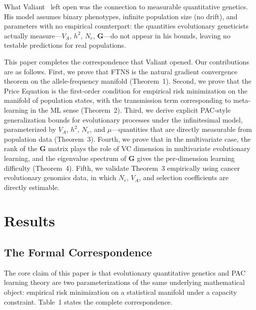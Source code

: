 \documentclass[12pt]{article}
\theoremstyle{remark}
\begin{document}
What Valiant~\cite{valiant2009} left open was the connection to measurable quantitative genetics. His model assumes binary phenotypes, infinite population size (no drift), and parameters with no empirical counterpart: the quantities evolutionary geneticists actually measure---$V_A$, $h^2$, $N_e$, $\mathbf{G}$---do not appear in his bounds, leaving no testable predictions for real populations.

This paper completes the correspondence that Valiant opened. Our contributions are as follows. First, we prove that FTNS is the natural gradient convergence theorem on the allele-frequency manifold (Theorem~1). Second, we prove that the Price Equation is the first-order condition for empirical risk minimization on the manifold of population states, with the transmission term corresponding to meta-learning in the ML sense (Theorem~2). Third, we derive explicit PAC-style generalization bounds for evolutionary processes under the infinitesimal model, parameterized by $V_A$, $h^2$, $N_e$, and $\mu$---quantities that are directly measurable from population data (Theorem~3). Fourth, we prove that in the multivariate case, the rank of the $\mathbf{G}$ matrix plays the role of VC dimension in multivariate evolutionary learning, and the eigenvalue spectrum of $\mathbf{G}$ gives the per-dimension learning difficulty (Theorem~4). Fifth, we validate Theorem~3 empirically using cancer evolutionary genomics data, in which $N_e$, $V_A$, and selection coefficients are directly estimable.

\section{Results}

\subsection{The Formal Correspondence}

The core claim of this paper is that evolutionary quantitative genetics and PAC learning theory are two parameterizations of the same underlying mathematical object: empirical risk minimization on a statistical manifold under a capacity constraint. Table~1 states the complete correspondence.
\end{document}
